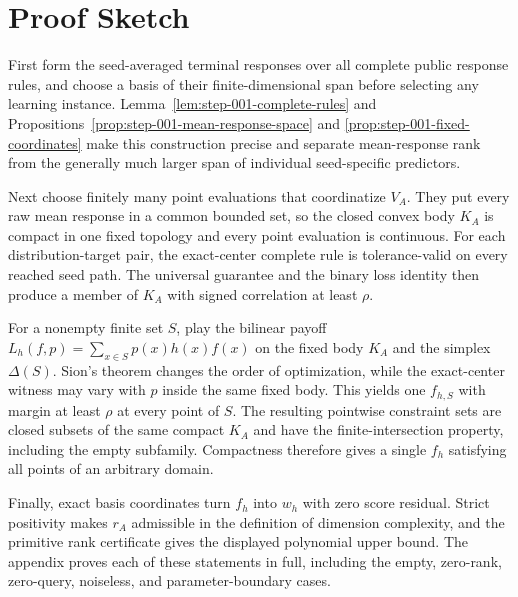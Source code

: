 \section{Proof Sketch}

First form the seed-averaged terminal responses over all complete public
response rules, and choose a basis of their finite-dimensional span before
selecting any learning instance.  Lemma~\ref{lem:step-001-complete-rules} and
Propositions~\ref{prop:step-001-mean-response-space} and
\ref{prop:step-001-fixed-coordinates} make this construction precise and
separate mean-response rank from the generally much larger span of individual
seed-specific predictors.

Next choose finitely many point evaluations that coordinatize \(V_A\).  They
put every raw mean response in a common bounded set, so the closed convex body
\(K_A\) is compact in one fixed topology and every point evaluation is
continuous.  For each distribution-target pair, the exact-center complete
rule is tolerance-valid on every reached seed path.  The universal guarantee
and the binary loss identity then produce a member of \(K_A\) with signed
correlation at least \(\rho\).

For a nonempty finite set \(S\), play the bilinear payoff
\(L_h(f,p)=\sum_{x\in S}p(x)h(x)f(x)\) on the fixed body \(K_A\) and the
simplex \(\Delta(S)\).  Sion's theorem
\citep[Theorem~3.4]{sion1958minimax} changes the order of optimization, while
the exact-center witness may vary with \(p\) inside the same fixed body.
This yields one \(f_{h,S}\) with margin at least \(\rho\) at every point of
\(S\).  The resulting pointwise constraint sets are closed subsets of the
same compact \(K_A\) and have the finite-intersection property, including the
empty subfamily.  Compactness therefore gives a single \(f_h\) satisfying all
points of an arbitrary domain.

Finally, exact basis coordinates turn \(f_h\) into \(w_h\) with zero score
residual.  Strict positivity makes \(r_A\) admissible in the definition of
dimension complexity, and the primitive rank certificate gives the displayed
polynomial upper bound.  The appendix proves each of these statements in full,
including the empty, zero-rank, zero-query, noiseless, and parameter-boundary
cases.
